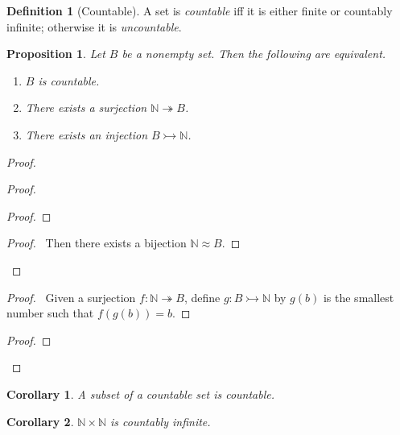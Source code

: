 \documentclass{book}
\let\qed\relax
\newtheorem{prop}[ax]{Proposition}
\newtheorem{cor}{Corollary}[ax]
\theoremstyle{definition}
\newtheorem{df}[ax]{Definition}
\begin{document}
\begin{df}[Countable]
A set is \emph{countable} iff it is either finite or countably infinite; otherwise it is \emph{uncountable}.
\end{df}

\begin{prop}
Let $B$ be a nonempty set. Then the following are equivalent.
\begin{enumerate}
\item $B$ is countable.
\item There exists a surjection $\mathbb{N} \twoheadrightarrow B$.
\item There exists an injection $B \rightarrowtail \mathbb{N}$.
\end{enumerate}
\end{prop}

\begin{proof}
\pf
{}
\begin{proof}
	\begin{proof}
	\end{proof}
	\begin{proof}
		\pf\ Then there exists a bijection $\mathbb{N} \approx B$.
	\end{proof}
\end{proof}
\begin{proof}
	\pf\ Given a surjection $f : \mathbb{N} \twoheadrightarrow B$, define $g : B \rightarrowtail \mathbb{N}$ by $g(b)$ is the smallest number such that $f(g(b)) = b$.
\end{proof}
\begin{proof}
\end{proof}
\qed
\end{proof}

\begin{cor}
A subset of a countable set is countable.
\end{cor}

\begin{cor}
$\mathbb{N} \times \mathbb{N}$ is countably infinite.
\end{cor}
\end{document}

